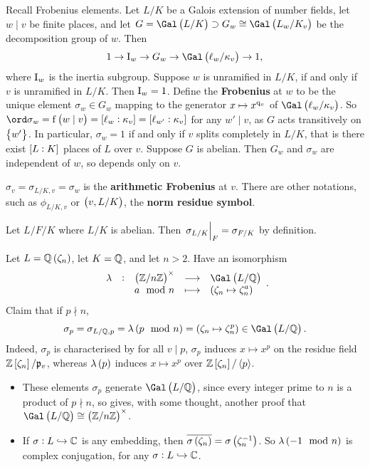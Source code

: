 Recall Frobenius elements. Let $ L / K $ be a Galois extension of number fields, let $ w \mid v $ be finite places, and let $ G = \Gal\br{L / K} \supset G_w \cong \Gal\br{L_w / K_v} $ be the decomposition group of $ w $. Then
$$ 1 \to \I_w \to G_w \to \Gal\br{\ell_w / \kappa_v} \to 1, $$
where $ \mathrm{I}_w $ is the inertia subgroup. Suppose $ w $ is unramified in $ L / K $, if and only if $ v $ is unramified in $ L / K $. Then $ \mathrm{I}_w = 1 $. Define the \textbf{Frobenius} at $ w $ to be the unique element $ \sigma_w \in G_w $ mapping to the generator $ x \mapsto x^{\mathrm{q}_v} $ of $ \Gal\br{\ell_w / \kappa_v} $. So $ \ord \sigma_w = \f\br{w \mid v} = \sbr{\ell_w : \kappa_v} = \sbr{\ell_{w'} : \kappa_v} $ for any $ w' \mid v $, as $ G $ acts transitively on $ \cbr{w'} $. In particular, $ \sigma_w = 1 $ if and only if $ v $ splits completely in $ L / K $, that is there exist $ \sbr{L : K} $ places of $ L $ over $ v $. Suppose $ G $ is abelian. Then $ G_w $ and $ \sigma_w $ are independent of $ w $, so depends only on $ v $.

\begin{notation*}
$ \sigma_v = \sigma_{L / K, v} = \sigma_w $ is the \textbf{arithmetic Frobenius} at $ v $. There are other notations, such as $ \phi_{L / K, v} $ or $ \br{v, L / K} $, the \textbf{norm residue symbol}.
\end{notation*}

\begin{remark*}
Let $ L / F / K $ where $ L / K $ is abelian. Then $ \left. \sigma_{L / K} \right|_F = \sigma_{F / K} $ by definition.
\end{remark*}

Let $ L = \QQ\br{\zeta_n} $, let $ K = \mathbb{Q} $, and let $ n > 2 $. Have an isomorphism
$$ \function[\lambda]{\br{\ZZ / n\ZZ}^\times}{\Gal\br{L / \QQ}}{a \mod n}{\br{\zeta_n \mapsto \zeta_n^a}}. $$
Claim that if $ p \nmid n $,
$$ \sigma_p = \sigma_{L / \QQ, p} = \lambda\br{p \mod n} = \br{\zeta_n \mapsto \zeta_n^p} \in \Gal\br{L / \QQ}. $$
Indeed, $ \sigma_p $ is characterised by for all $ v \mid p $, $ \sigma_p $ induces $ x \mapsto x^p $ on the residue field $ \ZZ\sbr{\zeta_n} / \ppp_v $, whereas $ \lambda\br{p} $ induces $ x \mapsto x^p $ over $ \ZZ\sbr{\zeta_n} / \abr{p} $.


\begin{remark*}
\hfill
\begin{itemize}
\item These elements $ \sigma_p $ generate $ \Gal\br{L / \QQ} $, since every integer prime to $ n $ is a product of $ p \nmid n $, so gives, with some thought, another proof that $ \Gal\br{L / \QQ} \cong \br{\ZZ / n\ZZ}^\times $.
\item If $ \sigma : L \hookrightarrow \mathbb{C} $ is any embedding, then $ \overline{\sigma\br{\zeta_n}} = \sigma\br{\zeta_n^{-1}} $. So $ \lambda\br{-1 \mod n} $ is complex conjugation, for any $ \sigma : L \hookrightarrow \mathbb{C} $.
\end{itemize}
\end{remark*}


